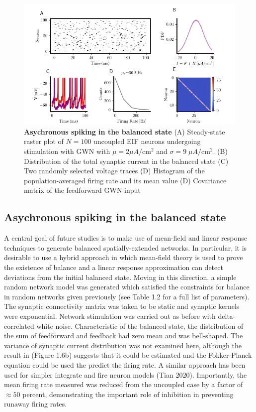 \documentclass{ucetd}
\begin{document}
\begin{figure}[t!]
\centering
\includegraphics[width=175mm]{figure-11}
\caption{\textbf{Asychronous spiking in the balanced state} (A) Steady-state raster plot of $N=100$ uncoupled EIF neurons undergoing stimulation with GWN with $\mu = 2\mu A/\mathrm{cm}^{2}$ and $\sigma = 9 \;\mu A/\mathrm{cm}^{2}$. (B) Distribution of the total synaptic current in the balanced state (C) Two randomly selected voltage traces (D) Histogram of the population-averaged firing rate and its mean value (D) Covariance matrix of the feedforward GWN input}
\end{figure}


\subsection{Asychronous spiking in the balanced state}

A central goal of future studies is to make use of mean-field and linear response techniques to generate balanced spatially-extended networks. In particular, it is desirable to use a hybrid approach in which mean-field theory is used to prove the existence of balance and a linear response approximation can detect deviations from the initial balanced state. Moving in this direction, a simple random network model was generated which satisfied the constraints for balance in random networks given previously (see Table 1.2 for a full list of parameters). The synaptic connectivity matrix was taken to be static and synaptic kernels were exponential.  Network stimulation was carried out as before with delta-correlated white noise. Characteristic of the balanced state, the distribution of the sum of feedforward and feedback had zero mean and was bell-shaped. The variance of synaptic current distribution was not examined here, although the result in (Figure 1.6b) suggests that it could be estimated and the Fokker-Planck equation could be used the predict the firing rate. A similar approach has been used for simpler integrate and fire neuron models (Tian 2020). Importantly, the mean firing rate measured was reduced from the uncoupled case by a factor of $\approx 50$ percent, demonstrating the important role of inhibition in preventing runaway firing rates. 
\end{document}
